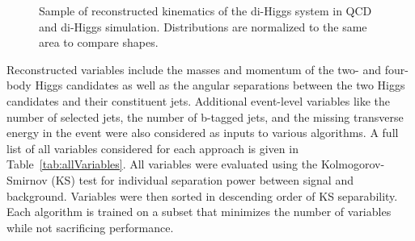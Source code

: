 \begin{figure}[ht!]
\begin{center}
  \caption{Sample of reconstructed kinematics of the di-Higgs system in QCD and di-Higgs simulation. Distributions are normalized to the same area to compare shapes.}
  \label{fig:recoInfo}
  \end{center}
\end{figure}


Reconstructed variables include the masses and momentum of the two- and four-body Higgs candidates as well as the angular separations between the two Higgs candidates and their constituent jets. Additional event-level variables like the number of selected jets, the number of b-tagged jets, and the missing transverse energy in the event were also considered as inputs to various algorithms. A full list of all variables considered for each approach is given in Table~\ref{tab:allVariables}. All variables were evaluated using the Kolmogorov-Smirnov (KS) test for individual separation power between signal and background. Variables were then sorted in descending order of KS separability. Each algorithm is trained on a subset that minimizes the number of variables while not sacrificing performance.


